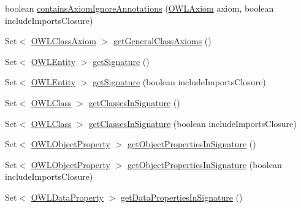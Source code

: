 \begin{DoxyCompactItemize}
boolean \hyperlink{interfaceorg_1_1semanticweb_1_1owlapi_1_1model_1_1_o_w_l_ontology_a2dc557b2d43e85a135bb01b3295275e2}{contains\-Axiom\-Ignore\-Annotations} (\hyperlink{interfaceorg_1_1semanticweb_1_1owlapi_1_1model_1_1_o_w_l_axiom}{O\-W\-L\-Axiom} axiom, boolean include\-Imports\-Closure)
\item 
Set$<$ \hyperlink{interfaceorg_1_1semanticweb_1_1owlapi_1_1model_1_1_o_w_l_class_axiom}{O\-W\-L\-Class\-Axiom} $>$ \hyperlink{interfaceorg_1_1semanticweb_1_1owlapi_1_1model_1_1_o_w_l_ontology_ae40508c509dccec32fb78b4b8cfafab4}{get\-General\-Class\-Axioms} ()
\item 
Set$<$ \hyperlink{interfaceorg_1_1semanticweb_1_1owlapi_1_1model_1_1_o_w_l_entity}{O\-W\-L\-Entity} $>$ \hyperlink{interfaceorg_1_1semanticweb_1_1owlapi_1_1model_1_1_o_w_l_ontology_aee70ef186c308d4a41df64199ced2e2c}{get\-Signature} ()
\item 
Set$<$ \hyperlink{interfaceorg_1_1semanticweb_1_1owlapi_1_1model_1_1_o_w_l_entity}{O\-W\-L\-Entity} $>$ \hyperlink{interfaceorg_1_1semanticweb_1_1owlapi_1_1model_1_1_o_w_l_ontology_a86133864a3dc50b9ad7be0093aef6b9c}{get\-Signature} (boolean include\-Imports\-Closure)
\item 
Set$<$ \hyperlink{interfaceorg_1_1semanticweb_1_1owlapi_1_1model_1_1_o_w_l_class}{O\-W\-L\-Class} $>$ \hyperlink{interfaceorg_1_1semanticweb_1_1owlapi_1_1model_1_1_o_w_l_ontology_a1f6340caef27fd1791a31603940f7549}{get\-Classes\-In\-Signature} ()
\item 
Set$<$ \hyperlink{interfaceorg_1_1semanticweb_1_1owlapi_1_1model_1_1_o_w_l_class}{O\-W\-L\-Class} $>$ \hyperlink{interfaceorg_1_1semanticweb_1_1owlapi_1_1model_1_1_o_w_l_ontology_a88db486645d303dafb314d908e35db63}{get\-Classes\-In\-Signature} (boolean include\-Imports\-Closure)
\item 
Set$<$ \hyperlink{interfaceorg_1_1semanticweb_1_1owlapi_1_1model_1_1_o_w_l_object_property}{O\-W\-L\-Object\-Property} $>$ \hyperlink{interfaceorg_1_1semanticweb_1_1owlapi_1_1model_1_1_o_w_l_ontology_a63a0131c118a891bbf04411ac37ae66e}{get\-Object\-Properties\-In\-Signature} ()
\item 
Set$<$ \hyperlink{interfaceorg_1_1semanticweb_1_1owlapi_1_1model_1_1_o_w_l_object_property}{O\-W\-L\-Object\-Property} $>$ \hyperlink{interfaceorg_1_1semanticweb_1_1owlapi_1_1model_1_1_o_w_l_ontology_a235462cb18fb89d2d01132e233aa233f}{get\-Object\-Properties\-In\-Signature} (boolean include\-Imports\-Closure)
\item 
Set$<$ \hyperlink{interfaceorg_1_1semanticweb_1_1owlapi_1_1model_1_1_o_w_l_data_property}{O\-W\-L\-Data\-Property} $>$ \hyperlink{interfaceorg_1_1semanticweb_1_1owlapi_1_1model_1_1_o_w_l_ontology_a79cd499333112099749404a7cdc3e1f7}{get\-Data\-Properties\-In\-Signature} ()

\end{DoxyCompactItemize}
